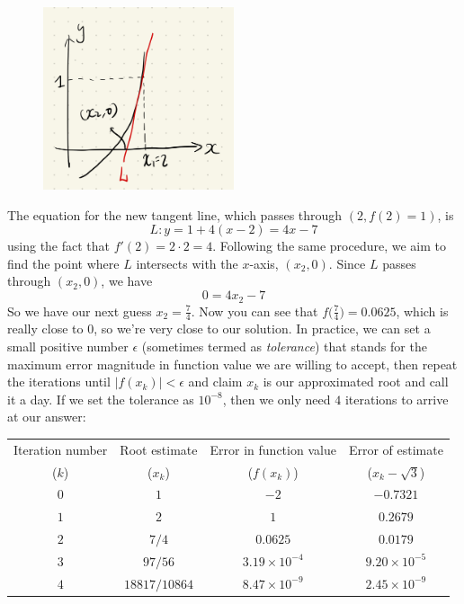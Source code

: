 \begin{figure}[ht]
    \centering
    \includegraphics[width = 0.5\textwidth]{figures/chap 05/newton_2.png}
    \label{fig: newton_2}
\end{figure}

The equation for the new tangent line, which passes through $(2, f(2) = 1)$, is
\[L: y = 1 + 4(x-2) = 4x-7\]
using the fact that $f'(2) = 2 \cdot 2 = 4$.  Following the same procedure, we aim to find the point where $L$ intersects with the $x$-axis, $(x_2, 0)$.  Since $L$ passes through $(x_2, 0)$, we have
\[0 = 4x_2-7\]
So we have our next guess $x_2 = \frac{7}{4}$.  Now you can see that $f\big(\frac{7}{4}\big) = 0.0625$, which is really close to $0$, so we're very close to our solution.  In practice, we can set a small positive number $\epsilon$ (sometimes termed as \textit{tolerance}) that stands for the maximum error magnitude in function value we are willing to accept, then repeat the iterations until $|f(x_k)| < \epsilon$ and claim $x_k$ is our approximated root and call it a day.  If we set the tolerance as $10^{-8}$, then we only need $4$ iterations to arrive at our answer:

\begin{table}[ht]
    \centering
    \begin{tabular}{cccc}
        Iteration number & Root estimate & Error in function value & Error of estimate\\
        ($k$) & ($x_k$) & ($f(x_k)$) & ($x_k - \sqrt{3}$)\\
        \hline
        $0$ & $1$ & $-2$ & $-0.7321$\\
        $1$ & $2$ & $1$ & $0.2679$\\
        $2$ & $7/4$ & $0.0625$ &  $0.0179$\\
        $3$ & $97/56$ & $3.19\times 10^{-4}$ & $9.20 \times 10^{-5}$\\
        $4$ & $18817/10864$ & $8.47\times 10^{-9}$ & $2.45 \times 10^{-9}$
    \end{tabular}
    \label{tab: newton_iteration}
\end{table}

